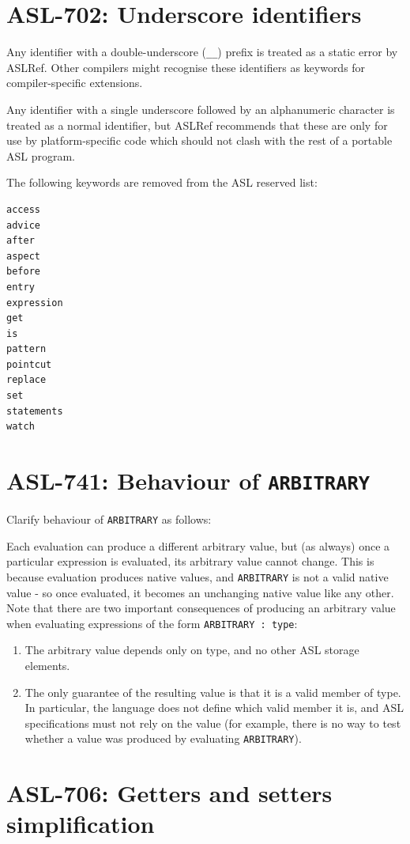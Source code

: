 \section{ASL-702: Underscore identifiers}

Any identifier with a double-underscore (\texttt{\_\_}) prefix is
treated as a static error by ASLRef. Other compilers might recognise
these identifiers as keywords for compiler-specific extensions.

Any identifier with a single underscore followed by an alphanumeric
character is treated as a normal identifier, but ASLRef recommends that
these are only for use by platform-specific code which should not clash
with the rest of a portable ASL program.

The following keywords are removed from the ASL reserved list:
\begin{verbatim}
access
advice
after
aspect
before
entry
expression
get
is
pattern
pointcut
replace
set
statements
watch
\end{verbatim}

\section{ASL-741: Behaviour of \texttt{ARBITRARY}}

Clarify behaviour of \texttt{ARBITRARY} as follows:

Each evaluation can produce a different arbitrary value, but (as always)
once a particular expression is evaluated, its arbitrary value cannot
change. This is because evaluation produces native values, and
\texttt{ARBITRARY} is not a valid native value - so once evaluated, it
becomes an unchanging native value like any other.  Note that there are
two important consequences of producing an arbitrary value when
evaluating expressions of the form \texttt{ARBITRARY : type}:
\begin{enumerate}
\item The arbitrary value depends only on type, and no other ASL storage
elements.

\item The only guarantee of the resulting value is that it is a valid member of
type. In particular, the language does not define which valid member it
is, and ASL specifications must not rely on the value (for example, there
is no way to test whether a value was produced by evaluating
\texttt{ARBITRARY}).
\end{enumerate}

\section{ASL-706: Getters and setters simplification}

